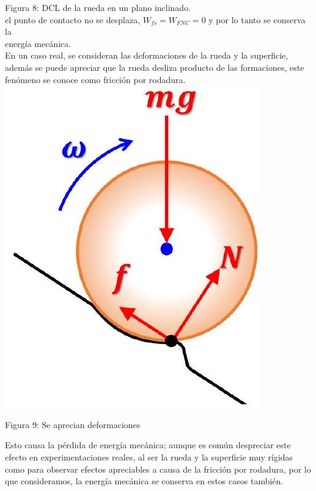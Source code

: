 \documentclass[10pt]{article}
\begin{document}
Figura 8: DCL de la rueda en un plano inclinado.\\
el punto de contacto no se desplaza, $W_{f s}=W_{F N C}=0$ y por lo tanto se conserva la\\
energía mecánica.\\
En un caso real, se consideran las deformaciones de la rueda y la superficie, además se puede apreciar que la rueda desliza producto de las formaciones, este fenómeno se conoce como fricción por rodadura.\\
\includegraphics[scale = 0.15, center]{2025_04_01_ea720b93e8ebb5d0c6aeg-09}

Figura 9: Se aprecian deformaciones

Esto causa la pérdida de energía mecánica; aunque es común despreciar este efecto en experimentaciones reales, al ser la rueda y la superficie muy rígidas como para observar efectos apreciables a causa de la fricción por rodadura, por lo que consideramos, la energía mecánica se conserva en estos casos también.
\end{document}
